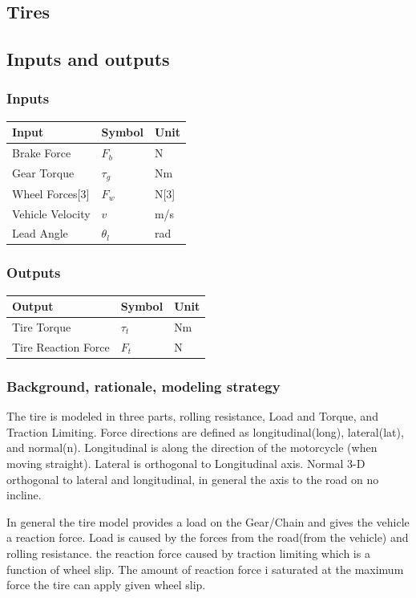 \documentclass[../SimBALink.tex]{subfiles}
\begin{document}
\subsection{Tires}
\subsection{Inputs and outputs}
	\subsubsection{Inputs}
	\begin{tabular}{ l | l | l  }
		Input					&	Symbol		&	Unit		\\	\hline
		Brake Force				& 	$F_b$ 		&	N \\
		Gear Torque				&	$\tau_g$	&	Nm \\
		Wheel Forces[3]			&	$F_w$		&	N[3] \\
		Vehicle Velocity		&	$v$			&	m/s \\
		Lead Angle				&	$\theta_l$	&	rad \\
	\end{tabular}
	
	\subsubsection{Outputs}
	\begin{tabular}{ l | l | l  }
		Output					&	Symbol		&	Unit		\\	\hline
		Tire Torque				&	$\tau_t$	&	Nm \\
		Tire Reaction Force		&	$F_t$		&	N \\
	\end{tabular}

\subsubsection{Background, rationale, modeling strategy} The tire is modeled in three parts, rolling resistance, Load and Torque, and Traction Limiting. Force directions are defined as longitudinal(long), lateral(lat), and normal(n). Longitudinal is along the direction of the motorcycle (when moving straight). Lateral is orthogonal to Longitudinal axis. Normal 3-D orthogonal to lateral and longitudinal, in general the axis to the road on no incline.

In general the tire model provides a load on the Gear/Chain and gives the vehicle a reaction force. Load is caused by the forces from the road(from the vehicle) and rolling resistance. the reaction force caused by traction limiting which is a function of wheel slip. The amount of reaction force i saturated at the maximum force the tire can apply given wheel slip.  
\end{document}
